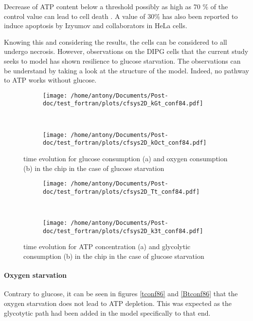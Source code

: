 \documentclass[11pt,a4paper]{article}
\begin{document}
Decrease of ATP content below a threshold possibly as high as 70 \% of the control value can lead to cell death \cite{Lieberthal1998}. A value of 30\% has also been reported to induce apoptosis by Izyumov and collaborators in HeLa cells.\cite{Izyumov2004}

Knowing this and considering the results, the cells can be considered to all undergo necrosis. However, observations on the DIPG cells that the current study seeks to model has shown resilience to glucose starvation. The observations can be understand by taking a look at the structure of the model. Indeed, no pathway to ATP works without glucose.

\begin{figure}[ht!]
	\begin{subfigure}{0.45\textwidth}
	\centering
	\texttt{[image: /home/antony/Documents/Post-doc/test\_fortran/plots/cfsys2D\_kGt\_conf84.pdf]}
	\caption{ \label{kGt_conf84}}
	\end{subfigure}
	~~
	\begin{subfigure}{0.45\textwidth}
	\texttt{[image: /home/antony/Documents/Post-doc/test\_fortran/plots/cfsys2D\_kOct\_conf84.pdf]}
		\caption{ \label{kOct_conf84}}
	\end{subfigure}
	\caption{time evolution for glucose consumption (a) and  oxygen consumption (b) in the chip in the case of glucose starvation \label{tconf84}}
\end{figure}

\begin{figure}[ht!]
	\begin{subfigure}{0.45\textwidth}
	\centering
	\texttt{[image: /home/antony/Documents/Post-doc/test\_fortran/plots/cfsys2D\_Tt\_conf84.pdf]}
	\caption{ \label{Tt_conf84}}
	\end{subfigure}
	~~
	\begin{subfigure}{0.45\textwidth}
	\texttt{[image: /home/antony/Documents/Post-doc/test\_fortran/plots/cfsys2D\_k3t\_conf84.pdf]}
		\caption{ \label{k3t_conf84}}
	\end{subfigure}
	\caption{time evolution for ATP concentration (a) and  glycolytic consumption (b) in the chip in the case of glucose starvation \label{Btconf82}}
\end{figure}

\paragraph{Oxygen starvation}
Contrary to glucose, it can be seen in figures \ref{tconf86} and \ref{Btconf86} that the oxygen starvation does not lead to ATP depletion. This was expected as the glycotytic path had been added in the model specifically to that end.
\end{document}
